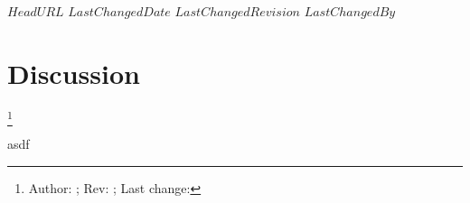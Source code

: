 \svnidlong
{$HeadURL$}
{$LastChangedDate$}
{$LastChangedRevision$}
{$LastChangedBy$}

\section{Discussion}
\footnote{Author: \svnauthor; Rev: \svnrev; Last change: \svndate}%

asdf
